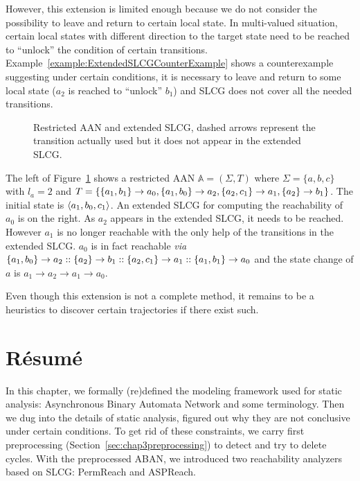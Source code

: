 However, this extension is limited enough because we do not consider the possibility to leave and return to certain local state.
In multi-valued situation, certain local states with different direction to the target state need to be reached to ``unlock'' the condition of certain transitions.
Example~\ref{example:ExtendedSLCGCounterExample} shows a counterexample suggesting under certain conditions, it is necessary to leave and return to some local state ($a_2$ is reached to ``unlock'' $b_1$) and SLCG does not cover all the needed transitions.
\begin{figure}[ht]
    \centering
    
    \caption[Counterexample of extended SLCG]{Restricted AAN and extended SLCG, dashed arrows represent the transition actually used but it does not appear in the extended SLCG.}
    \label{fig:ExtendedSLCGCounterExample}
\end{figure}
\begin{example}\label{example:ExtendedSLCGCounterExample}
The left of Figure~\ref{fig:ExtendedSLCGCounterExample} shows a restricted AAN $\mathbb{A}=(\Sigma,T)$ where $\Sigma=\{a,b,c\} $ with $l_a=2$ and $T=\{\{a_1,b_1\}\rightarrow a_0,\{a_1,b_0\}\rightarrow a_2,\{a_2,c_1\}\rightarrow a_1,\{a_2\}\rightarrow b_1\}$.
The initial state is $\langle a_1,b_0,c_1\rangle$.
An extended SLCG for computing the reachability of $a_0$ is on the right.
As $a_2$ appears in the extended SLCG, it needs to be reached.
However $a_1$ is no longer reachable with the only help of the transitions in the extended SLCG.
$a_0$ is in fact reachable \textit{via} $\{a_1,b_0\}\rightarrow a_2::\{a_2\}\rightarrow b_1::\{a_2,c_1\}\rightarrow a_1::\{a_1,b_1\}\rightarrow a_0$ and the state change of $a$ is $a_1\to a_2\to a_1\to a_0$.
\end{example}

Even though this extension is not a complete method, it remains to be a heuristics to discover certain trajectories if there exist such.



    

\section{R\'esum\'e}
In this chapter, we formally (re)defined the modeling framework used for static analysis: Asynchronous Binary Automata Network and some terminology.
Then we dug into the details of static analysis, figured out why they are not conclusive under certain conditions.
To get rid of these constraints, we carry first preprocessing (Section~\ref{sec:chap3preprocessing}) to detect and try to delete cycles.
With the preprocessed ABAN, we introduced two reachability analyzers based on SLCG: PermReach and ASPReach.

